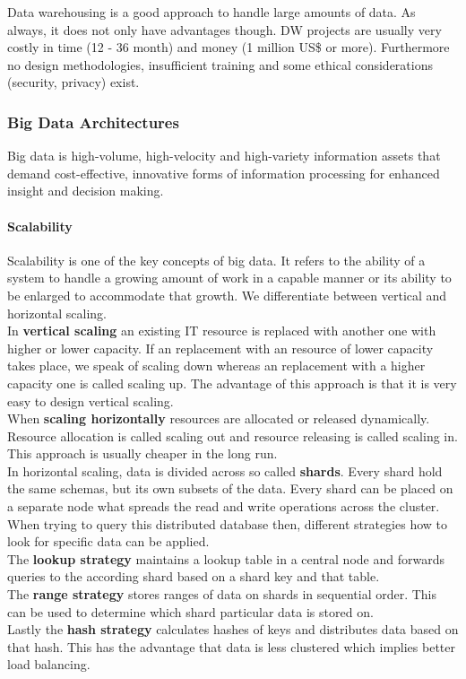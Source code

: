Data warehousing is a good approach to handle large amounts of data.
As always, it does not only have advantages though.
DW projects are usually very costly in time (12 - 36 month) and money (1 million US\$ or more).
Furthermore no design methodologies, insufficient training and some ethical considerations (security, privacy) exist.

\subsubsection{Big Data Architectures}
Big data is high-volume, high-velocity and high-variety information assets that demand cost-effective, innovative forms of information processing for enhanced insight and decision making.

\paragraph{Scalability}
Scalability is one of the key concepts of big data.
It refers to the ability of a system to handle a growing amount of work in a capable manner or its ability to be enlarged to accommodate that growth. We differentiate between vertical and horizontal scaling.\\
In \textbf{vertical scaling} an existing IT resource is replaced with another one with higher or lower capacity.
If an replacement with an resource of lower capacity takes place, we speak of scaling down whereas an replacement with a higher capacity one is called scaling up.
The advantage of this approach is that it is very easy to design vertical scaling.\\
When \textbf{scaling horizontally} resources are allocated or released dynamically.
Resource allocation is called scaling out and resource releasing is called scaling in.
This approach is usually cheaper in the long run.\\

In horizontal scaling, data is divided across so called \textbf{shards}.
Every shard hold the same schemas, but its own subsets of the data.
Every shard can be placed on a separate node what spreads the read and write operations across the cluster.
When trying to query this distributed database then, different strategies how to look for specific data can be applied.\\
The \textbf{lookup strategy} maintains a lookup table in a central node and forwards queries to the according shard based on a shard key and that table.\\
The \textbf{range strategy} stores ranges of data on shards in sequential order. This can be used to determine which shard particular data is stored on.\\
Lastly the \textbf{hash strategy} calculates hashes of keys and distributes data based on that hash.
This has the advantage that data is less clustered which implies better load balancing.

